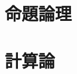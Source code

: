 \documentclass[a4paper]{jsarticle}
\title{\myTitle}
\author{\myAuthor}
\begin{document}
\maketitle

\section{命題論理}





\section{計算論}


\end{document}
